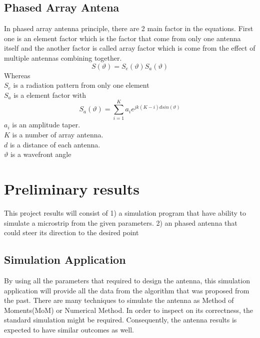 \documentclass[11pt,a4paper]{article}
\begin{document}
    \subsection{Phased Array Antena}
      In phased array antenna principle, there are 2 main factor in the equations. First one is an element factor which is the factor that come from only one antenna itself and the another factor is called array factor which is come from the effect of multiple antennas combining together.
      \begin{equation} 
        S(\vartheta)=S_{e}(\vartheta)S_a(\vartheta)  \label{ii}
      \end{equation}
        Whereas \\[1ex]
        \indent $S_{e}$ is a radiation pattern from only one element\\
        \indent $S_{a}$ is a element factor with
        \begin{equation} 
          S_{a}(\vartheta) = \sum\limits_{i=1}^K a_{i}e^{jk(K-i)dsin(\vartheta)}
        \end{equation}
        \indent $a_{i}$ is an amplitude taper.\\
        \indent $K$ is a number of array antenna.\\
        \indent $d$ is a distance of each antenna.\\
        \indent $\vartheta$ is a wavefront angle

  \pagebreak

  \section{Preliminary results}
    \indent This project results will consist of
    1) a simulation program that have ability  to simulate a microstrip from the given parameters.
    2) an phased antenna that could steer its direction to the desired point 
    
    \subsection{Simulation Application}
    \indent By using all the parameters that required to design the antenna, this simulation application will provide
    all the data from the algorithm that was proposed from the past. There are many techniques to simulate the antenna
    as Method of Moments(MoM) or Numerical Method. In order to inspect on its correctness, the standard simulation might
    be required. Consequently, the antenna results is expected to have similar outcomes as well.
\end{document}
